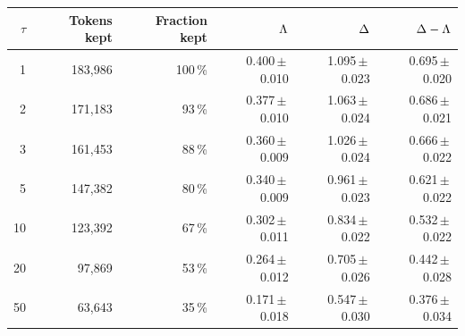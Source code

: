 \begin{tabular}{@{}r r r r r r@{}}
\toprule
$\tau$ & Tokens kept & Fraction kept & $\Lambda$ & $\Delta$ & $\Delta-\Lambda$ \\
\midrule
1 & 183{,}986 & 100\,\% & 0.400\,$\pm$\,0.010 & 1.095\,$\pm$\,0.023 & 0.695\,$\pm$\,0.020 \\
2 & 171{,}183 & 93\,\% & 0.377\,$\pm$\,0.010 & 1.063\,$\pm$\,0.024 & 0.686\,$\pm$\,0.021 \\
3 & 161{,}453 & 88\,\% & 0.360\,$\pm$\,0.009 & 1.026\,$\pm$\,0.024 & 0.666\,$\pm$\,0.022 \\
5 & 147{,}382 & 80\,\% & 0.340\,$\pm$\,0.009 & 0.961\,$\pm$\,0.023 & 0.621\,$\pm$\,0.022 \\
10 & 123{,}392 & 67\,\% & 0.302\,$\pm$\,0.011 & 0.834\,$\pm$\,0.022 & 0.532\,$\pm$\,0.022 \\
20 & 97{,}869 & 53\,\% & 0.264\,$\pm$\,0.012 & 0.705\,$\pm$\,0.026 & 0.442\,$\pm$\,0.028 \\
50 & 63{,}643 & 35\,\% & 0.171\,$\pm$\,0.018 & 0.547\,$\pm$\,0.030 & 0.376\,$\pm$\,0.034 \\
\bottomrule
\end{tabular}